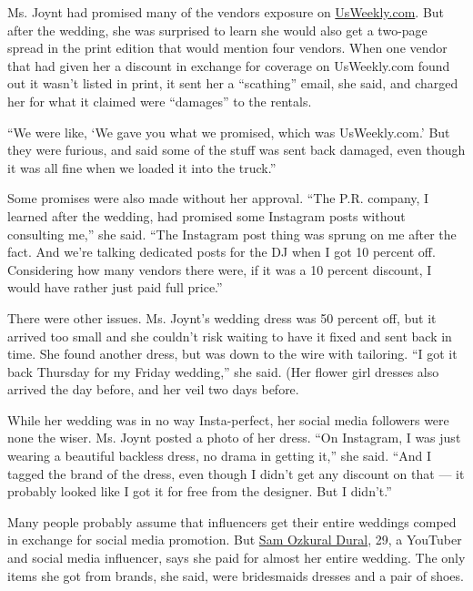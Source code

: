 Ms. Joynt had promised many of the vendors exposure on
\href{https://www.usmagazine.com/celebrity-news/pictures/bachelor-alum-sharleen-joynt-marries-andy-levine-see-the-photos-from-their-star-studded-wedding-w502677/}{UsWeekly.com}.
But after the wedding, she was surprised to learn she would also get a
two-page spread in the print edition that would mention four vendors.
When one vendor that had given her a discount in exchange for coverage
on UsWeekly.com found out it wasn't listed in print, it sent her a
``scathing'' email, she said, and charged her for what it claimed were
``damages'' to the rentals.

``We were like, `We gave you what we promised, which was UsWeekly.com.'
But they were furious, and said some of the stuff was sent back damaged,
even though it was all fine when we loaded it into the truck.''

Some promises were also made without her approval. ``The P.R. company, I
learned after the wedding, had promised some Instagram posts without
consulting me,'' she said. ``The Instagram post thing was sprung on me
after the fact. And we're talking dedicated posts for the DJ when I got
10 percent off. Considering how many vendors there were, if it was a 10
percent discount, I would have rather just paid full price.''

There were other issues. Ms. Joynt's wedding dress was 50 percent off,
but it arrived too small and she couldn't risk waiting to have it fixed
and sent back in time. She found another dress, but was down to the wire
with tailoring. ``I got it back Thursday for my Friday wedding,'' she
said. (Her flower girl dresses also arrived the day before, and her veil
two days before.

While her wedding was in no way Insta-perfect, her social media
followers were none the wiser. Ms. Joynt posted a photo of her dress.
``On Instagram, I was just wearing a beautiful backless dress, no drama
in getting it,'' she said. ``And I tagged the brand of the dress, even
though I didn't get any discount on that --- it probably looked like I
got it for free from the designer. But I didn't.''

Many people probably assume that influencers get their entire weddings
comped in exchange for social media promotion. But
\href{https://www.instagram.com/samozkural/}{Sam Ozkural Dural}, 29, a
YouTuber and social media influencer, says she paid for almost her
entire wedding. The only items she got from brands, she said, were
bridesmaids dresses and a pair of shoes.

